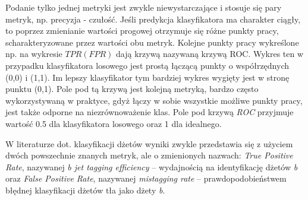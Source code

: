 \begin{appendices}
Podanie tylko jednej metryki jest zwykle niewystarczające i stosuje się pary metryk, np. precyzja - czułość. Jeśli predykcja klasyfikatora ma charakter ciągły, to poprzez zmienianie wartości progowej otrzymuje się różne punkty pracy, scharakteryzowane przez wartości obu metryk. Kolejne punkty pracy wykreślone np. na wykresie $TPR(FPR)$ dają krzywą nazywaną krzywą ROC. 
Wykres ten w przypadku klasyfikatora losowego jest prostą łączącą punkty o współrzędnych (0,0) i (1,1). Im lepszy klasyfikator tym bardziej wykres wygięty jest w stronę punktu (0,1).
Pole pod tą krzywą  jest kolejną metryką, bardzo często wykorzystywaną w praktyce, gdyż łączy w sobie wszystkie możliwe punkty pracy, jest także odporne na niezrównoważenie klas. Pole pod krzywą \textit{ROC} przyjmuje wartość 0.5 dla klasyfikatora losowego oraz 1 dla idealnego.

W literaturze dot. klasyfikacji dżetów wyniki zwykle przedstawia się z użyciem dwóch powszechnie znanych metryk, ale o zmienionych nazwach:
\textit{True Positive Rate}, nazywanej \textit{b jet tagging efficiency} -- wydajnością na identyfikację dżetów \textit{b} oraz \textit{False Positive Rate}, nazywanej \textit{mistagging rate}  -- prawdopodobieństwem błędnej klasyfikacji dżetów tła jako dżety \textit{b}.

\clearpage
\FloatBarrier

\end{appendices}
